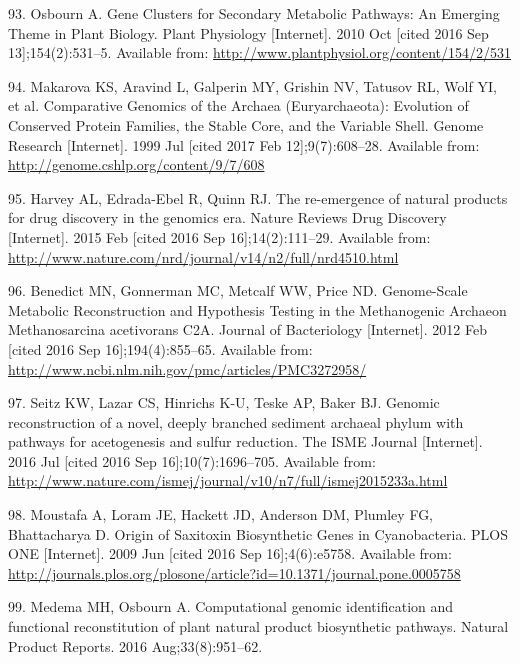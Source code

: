 \documentclass[12pt,twoside]{reedthesis}
\begin{document}
  \hypertarget{ref-osbourn_gene_2010}{}
  93. Osbourn A. Gene Clusters for Secondary Metabolic Pathways: An
  Emerging Theme in Plant Biology. Plant Physiology {[}Internet{]}. 2010
  Oct {[}cited 2016 Sep 13{]};154(2):531--5. Available from:
  \url{http://www.plantphysiol.org/content/154/2/531}
  
  \hypertarget{ref-makarova_comparative_1999}{}
  94. Makarova KS, Aravind L, Galperin MY, Grishin NV, Tatusov RL, Wolf
  YI, et al. Comparative Genomics of the Archaea (Euryarchaeota):
  Evolution of Conserved Protein Families, the Stable Core, and the
  Variable Shell. Genome Research {[}Internet{]}. 1999 Jul {[}cited 2017
  Feb 12{]};9(7):608--28. Available from:
  \url{http://genome.cshlp.org/content/9/7/608}
  
  \hypertarget{ref-harvey_re-emergence_2015}{}
  95. Harvey AL, Edrada-Ebel R, Quinn RJ. The re-emergence of natural
  products for drug discovery in the genomics era. Nature Reviews Drug
  Discovery {[}Internet{]}. 2015 Feb {[}cited 2016 Sep
  16{]};14(2):111--29. Available from:
  \url{http://www.nature.com/nrd/journal/v14/n2/full/nrd4510.html}
  
  \hypertarget{ref-benedict_genome-scale_2012}{}
  96. Benedict MN, Gonnerman MC, Metcalf WW, Price ND. Genome-Scale
  Metabolic Reconstruction and Hypothesis Testing in the Methanogenic
  Archaeon Methanosarcina acetivorans C2A. Journal of Bacteriology
  {[}Internet{]}. 2012 Feb {[}cited 2016 Sep 16{]};194(4):855--65.
  Available from:
  \url{http://www.ncbi.nlm.nih.gov/pmc/articles/PMC3272958/}
  
  \hypertarget{ref-seitz_genomic_2016}{}
  97. Seitz KW, Lazar CS, Hinrichs K-U, Teske AP, Baker BJ. Genomic
  reconstruction of a novel, deeply branched sediment archaeal phylum with
  pathways for acetogenesis and sulfur reduction. The ISME Journal
  {[}Internet{]}. 2016 Jul {[}cited 2016 Sep 16{]};10(7):1696--705.
  Available from:
  \url{http://www.nature.com/ismej/journal/v10/n7/full/ismej2015233a.html}
  
  \hypertarget{ref-moustafa_origin_2009}{}
  98. Moustafa A, Loram JE, Hackett JD, Anderson DM, Plumley FG,
  Bhattacharya D. Origin of Saxitoxin Biosynthetic Genes in Cyanobacteria.
  PLOS ONE {[}Internet{]}. 2009 Jun {[}cited 2016 Sep 16{]};4(6):e5758.
  Available from:
  \url{http://journals.plos.org/plosone/article?id=10.1371/journal.pone.0005758}
  
  \hypertarget{ref-medema_computational_2016}{}
  99. Medema MH, Osbourn A. Computational genomic identification and
  functional reconstitution of plant natural product biosynthetic
  pathways. Natural Product Reports. 2016 Aug;33(8):951--62.
  
\end{document}
